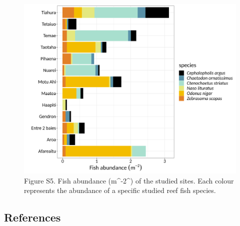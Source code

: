 \documentclass[
]{article}
\begin{document}
\begin{figure}
\includegraphics[width=41.67in]{../output/plots/community_plot_abundance} \caption{Figure S5. Fish abundance (m^-2^) of the studied sites. Each colour represents the abundance of a specific studied reef fish species.}\label{fig:unnamed-chunk-9}
\end{figure}

\newpage

\hypertarget{references}{%
\subsection{References}\label{references}}

  
\end{document}
